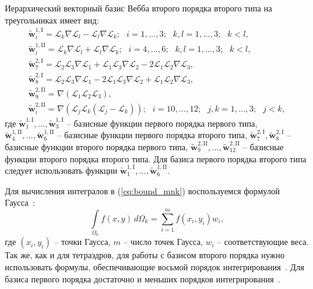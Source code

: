 \documentclass[a4paper,12pt]{article}
\begin{document}
Иерархический векторный базис Вебба второго порядка второго типа на треугольниках имеет вид:
\begin{equation*}
	\begin{matrix}
		\displaystyle
		\tilde{\mathbf{w}}_{i}^{1,\mathrm{I}} = \mathcal{L}_k \nabla \mathcal{L}_l - \mathcal{L}_l \nabla \mathcal{L}_k ;
		\scriptstyle
		\text{~~} i = 1, ..., 3 ; \text{~~} k, l = 1, ..., 3 ; \text{~~} k < l ,\\
		\displaystyle
		\tilde{\mathbf{w}}_{i}^{1,\mathrm{II}} = \mathcal{L}_k \nabla \mathcal{L}_l + \mathcal{L}_l \nabla \mathcal{L}_k ;
		\scriptstyle
		\text{~~} i = 4, ..., 6 ; \text{~~} k, l = 1, ..., 3 ; \text{~~} k < l ,\\
		\displaystyle
		\tilde{\mathbf{w}}_{7}^{2,\mathrm{I}} = \mathcal{L}_2 \mathcal{L}_3 \nabla \mathcal{L}_1 + \mathcal{L}_1 \mathcal{L}_3 \nabla \mathcal{L}_2 - 2 \mathcal{L}_1 \mathcal{L}_2 \nabla \mathcal{L}_3 ,\\
		\displaystyle
		\tilde{\mathbf{w}}_{8}^{2,\mathrm{I}} = \mathcal{L}_2 \mathcal{L}_3 \nabla \mathcal{L}_1 - 2 \mathcal{L}_1 \mathcal{L}_3 \nabla \mathcal{L}_2 + \mathcal{L}_1 \mathcal{L}_2 \nabla \mathcal{L}_3 ,\\
		\displaystyle
		\tilde{\mathbf{w}}_{9}^{2,\mathrm{II}} = \nabla ( \mathcal{L}_1 \mathcal{L}_2 \mathcal{L}_3 ) ,\\
		\displaystyle
		\tilde{\mathbf{w}}_{i}^{2,\mathrm{II}} = \nabla ( \mathcal{L}_j \mathcal{L}_k ( \mathcal{L}_j - \mathcal{L}_k ) ) ;
		\scriptstyle
		\text{~~} i = 10, ..., 12 ; \text{~~} j, k = 1, ..., 3 ; \text{~~} j < k ,
	\end{matrix}
	\label{eq:tr_basis}
\end{equation*}
где $\tilde{\mathbf{w}}_{1}^{1,\mathrm{I}}, ..., \tilde{\mathbf{w}}_{3}^{1,\mathrm{I}}$ -- базисные функции первого порядка первого типа, $\tilde{\mathbf{w}}_{4}^{1,\mathrm{II}}, ..., \tilde{\mathbf{w}}_{6}^{1,\mathrm{II}}$ -- базисные функции первого порядка второго типа, $\tilde{\mathbf{w}}_{7}^{2,\mathrm{I}}, \tilde{\mathbf{w}}_{8}^{2,\mathrm{I}}$ -- базисные функции второго порядка первого типа, $\tilde{\mathbf{w}}_{9}^{2,\mathrm{II}}, ..., \tilde{\mathbf{w}}_{12}^{2,\mathrm{II}}$ -- базисные функции второго порядка второго типа. Для базиса первого порядка второго типа следует использовать функции $\tilde{\mathbf{w}}_{1}^{1,\mathrm{I}}, ..., \tilde{\mathbf{w}}_{6}^{1,\mathrm{II}}$.

Для вычисления интегралов в (\ref{eq:bound_mnk}) воспользуемся формулой Гаусса~\citep{misovskih}:
\begin{equation*}
	\int\limits_{\Omega_k} f(x, y) \,d\Omega_k = \sum\limits_{i = 1}^m f( x_i , y_i) w_i ,
\end{equation*}
где $(x_i , y_i)$ -- точки Гаусса, $m$ -- число точек Гаусса, $w_i$ -- соответствующие веса. Так же, как и для тетраэдров, для работы с базисом второго порядка нужно использовать формулы, обеспечивающие восьмой порядок интегрирования~\citep{zhang_integration}. Для базиса первого порядка достаточно и меньших порядков интегрирования~\citep{misovskih}.
\end{document}
